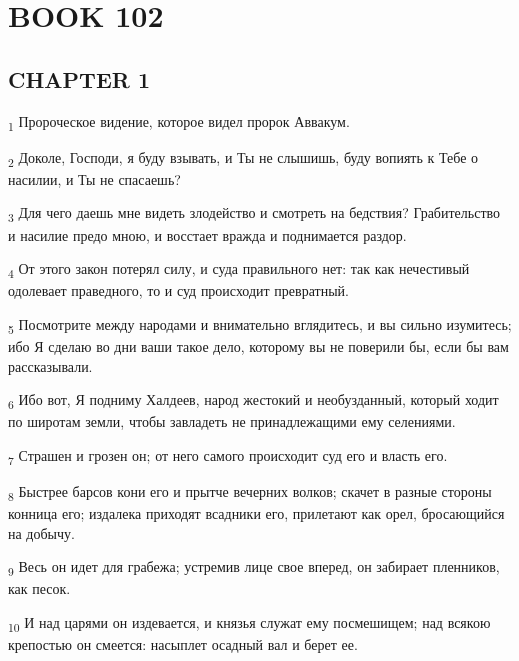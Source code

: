 \section{BOOK 102}
\subsection{CHAPTER 1}
\begin{tcolorbox}
\textsubscript{1} Пророческое видение, которое видел пророк Аввакум.
\end{tcolorbox}
\begin{tcolorbox}
\textsubscript{2} Доколе, Господи, я буду взывать, и Ты не слышишь, буду вопиять к Тебе о насилии, и Ты не спасаешь?
\end{tcolorbox}
\begin{tcolorbox}
\textsubscript{3} Для чего даешь мне видеть злодейство и смотреть на бедствия? Грабительство и насилие предо мною, и восстает вражда и поднимается раздор.
\end{tcolorbox}
\begin{tcolorbox}
\textsubscript{4} От этого закон потерял силу, и суда правильного нет: так как нечестивый одолевает праведного, то и суд происходит превратный.
\end{tcolorbox}
\begin{tcolorbox}
\textsubscript{5} Посмотрите между народами и внимательно вглядитесь, и вы сильно изумитесь; ибо Я сделаю во дни ваши такое дело, которому вы не поверили бы, если бы вам рассказывали.
\end{tcolorbox}
\begin{tcolorbox}
\textsubscript{6} Ибо вот, Я подниму Халдеев, народ жестокий и необузданный, который ходит по широтам земли, чтобы завладеть не принадлежащими ему селениями.
\end{tcolorbox}
\begin{tcolorbox}
\textsubscript{7} Страшен и грозен он; от него самого происходит суд его и власть его.
\end{tcolorbox}
\begin{tcolorbox}
\textsubscript{8} Быстрее барсов кони его и прытче вечерних волков; скачет в разные стороны конница его; издалека приходят всадники его, прилетают как орел, бросающийся на добычу.
\end{tcolorbox}
\begin{tcolorbox}
\textsubscript{9} Весь он идет для грабежа; устремив лице свое вперед, он забирает пленников, как песок.
\end{tcolorbox}
\begin{tcolorbox}
\textsubscript{10} И над царями он издевается, и князья служат ему посмешищем; над всякою крепостью он смеется: насыплет осадный вал и берет ее.
\end{tcolorbox}
